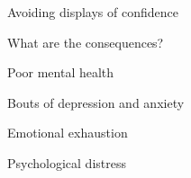 \documentclass[aspectratio=169]{beamer}
\begin{document}
\begin{frame}
  \begin{center}
    \Huge Avoiding displays of confidence
    \\ \small \cite{clanceimes78}
  \end{center}
\end{frame}

\begin{frame}
  \begin{center}
    \Huge What are the consequences?
  \end{center}
\end{frame}

\begin{frame}
  \begin{center}
    \Huge Poor mental health
    \\ \small \cite{sakulku11}
  \end{center}
\end{frame}

\begin{frame}
  \begin{center}
    \Huge Bouts of depression and anxiety
    \\ \small \cite{hh15}
  \end{center}
\end{frame}

\begin{frame}
  \begin{center}
    \Huge Emotional exhaustion
    \\ \small \cite{hh15}
  \end{center}
\end{frame}


\begin{frame}
  \begin{center}
    \Huge Psychological distress

    \\ \small \cite{hh15}
  \end{center}
\end{frame}
\end{document}
